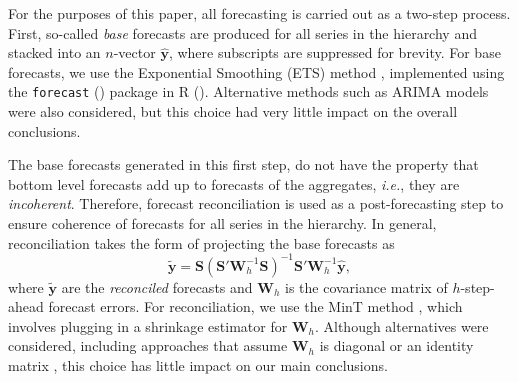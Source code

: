\documentclass[a4paper,review,12pt,authoryear]{elsarticle}
\let\code=\texttt
\begin{document}

For the purposes of this paper, all forecasting is carried out as a two-step process. First, so-called \textit{base} forecasts are produced for all series in the hierarchy and stacked into an $n$-vector $\hat{\bm{y}}$, where subscripts are suppressed for brevity. For base forecasts, we use the Exponential Smoothing (ETS) method \citep{ForecastingExponentialSmoothing}, implemented using the \code{forecast} (\citealp{forecast}) package in {R} (\citealp{R}). Alternative methods such as ARIMA models were also considered, but this choice had very little impact on the overall conclusions. 

The base forecasts generated in this first step, do not have the property that bottom level forecasts add up to forecasts of the aggregates, \textit{i.e.}, they are \textit{incoherent}. Therefore, forecast reconciliation is used as a post-forecasting step to ensure coherence of forecasts for all series in the hierarchy. In general, reconciliation takes the form of projecting the base forecasts as
\[
    \tilde{\boldsymbol{y}} = \boldsymbol{S}(\boldsymbol{S}'\boldsymbol{W}_h^{-1}\boldsymbol{S})^{-1}\boldsymbol{S}'\boldsymbol{W}_h^{-1}\hat{\boldsymbol{y}},
\]
where $\tilde{\boldsymbol{y}}$ are the \textit{reconciled} forecasts and $\boldsymbol{W}_h$ is the covariance matrix of $h$-step-ahead forecast errors. For reconciliation, we use the MinT method \citep{wickramasuriyaOptimalForecastReconciliation2019}, which involves plugging in a shrinkage estimator for $\boldsymbol{W}_h$. Although alternatives were considered, including approaches that assume $\boldsymbol{W}_h$ is diagonal or an identity matrix \citep{hyndmanOptimalCombinationForecasts2011}, this choice has little impact on our main conclusions.
\end{document}
